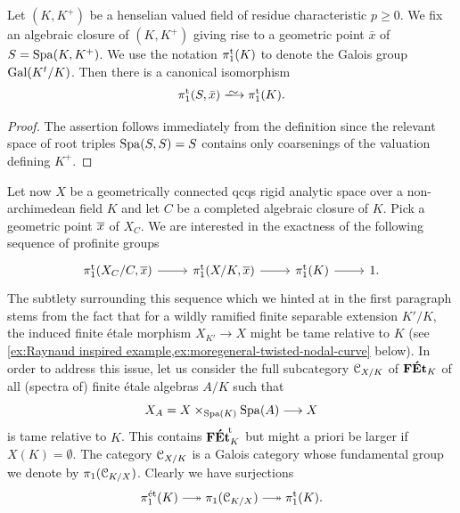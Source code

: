 \begin{lem} \label{lem:structure of pitame na field}
    Let $(K,K^+)$ be a henselian valued field of residue characteristic $p \ge 0$.
    We fix an algebraic closure of $(K,K^+)$ giving rise to a geometric point $\bar x$ of $S=\operatorname{Spa}(K,K^+)$.
    We use the notation $\pi_1^{\mathrm{t}}(K)$ to denote the Galois group $\operatorname{Gal}(K^t/K)$.
    Then there is a canonical isomorphism
        \[
        \pitame(S,\bar x) \isomto \pitame(K).
        \]
\end{lem}

\begin{proof}
    The assertion follows immediately from the definition since the relevant space of root triples $\operatorname{Spa}(S,S) = S$ contains only coarsenings of the valuation defining $K^+$. 
\end{proof}

Let now $X$ be a geometrically connected qcqs rigid analytic space over a non-archimedean field $K$ and let $C$ be a completed algebraic closure of $K$. Pick a geometric point $\overline{x}$ of $X_C$. We are interested in the exactness of the following sequence of profinite groups 
\begin{equation} \label{eqn:fundamental-ex-seq}
    \begin{tikzcd}
        \pitame(X_C/C, \ov x)\ar[r] & \pitame(X/K,\ov x) \ar[r] & \pitame(K)\ar[r] & 1.
    \end{tikzcd}
\end{equation}
The subtlety surrounding this sequence which we hinted at in the first paragraph stems from the fact that for a wildly ramified finite separable extension $K'/K$, the induced finite \'etale morphism $X_{K'}\to X$ might be tame relative to $K$ (see \cref{ex:Raynaud inspired example,ex:moregeneral-twisted-nodal-curve} below). 
In order to address this issue, let us consider the full subcategory ${\mathcal C}_{X/K}$ of $\mathbf{F\acute{E}t}_K$ of all (spectra of) finite \'etale algebras $A/K$ such that 
\[
    X_A = X \times_{\operatorname{Spa}(K)} \operatorname{Spa}(A)\longrightarrow X
\]
is tame relative to $K$. This contains ${\mathbf{F\acute{E}t}}^{\!\mathrm{t}}_{K}$ but might a priori be larger if $X(K)=\emptyset$. The category ${\mathcal C}_{X/K}$ is a Galois category whose fundamental group we denote by $\pi_1({\mathcal C}_{K/X})$. Clearly we have surjections
\[
\pi_1^\et(K) \surj \pi_1(\cC_{K/X}) \surj \pitame(K).
\]

